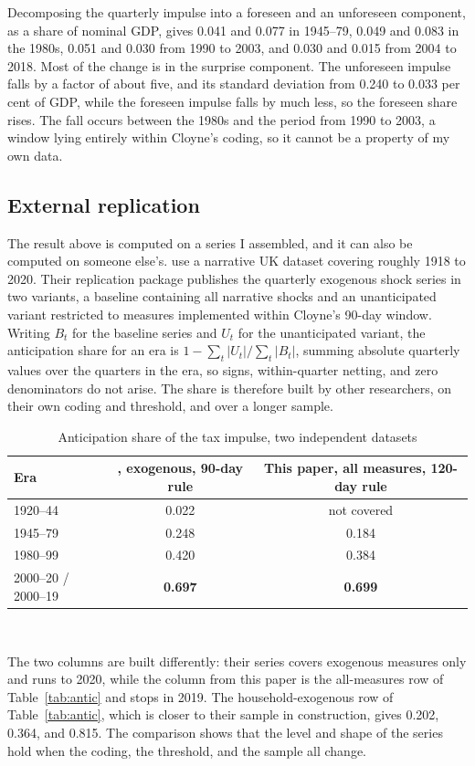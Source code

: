 \documentclass[11pt,a4paper]{article}
\begin{document}
Decomposing the quarterly impulse into a foreseen and an unforeseen component, as a share of nominal
GDP, gives 0.041 and 0.077 in 1945--79, 0.049 and 0.083 in the 1980s, 0.051 and 0.030 from 1990 to
2003, and 0.030 and 0.015 from 2004 to 2018. Most of the change is in the surprise component. The unforeseen impulse falls by a factor of about five, and its standard deviation from 0.240 to 0.033 per cent of GDP, while the foreseen impulse falls by much less, so the foreseen share rises. The fall occurs between the 1980s and the period from 1990 to 2003, a window lying entirely within
Cloyne's coding, so it cannot be a property of my own data.

\subsection{External replication}\label{sec:external}

The result above is computed on a series I assembled, and it can also be computed on someone else's.
\citet{cloyne2025} use a narrative UK dataset covering roughly 1918 to 2020. Their replication package publishes the quarterly exogenous shock series in two variants, a
baseline containing all narrative shocks and an unanticipated variant restricted to measures
implemented within Cloyne's 90-day window. Writing $B_t$ for the baseline series and $U_t$ for the
unanticipated variant, the anticipation share for an era is $1 - \sum_t |U_t| / \sum_t |B_t|$, summing
absolute quarterly values over the quarters in the era, so signs, within-quarter netting, and zero denominators do not arise. The share is therefore built by other researchers, on their own coding and threshold, and over a longer sample.

\begin{table}[htbp]
\centering
\footnotesize
\caption{Anticipation share of the tax impulse, two independent datasets}
\label{tab:external}
\begin{tabular}{lcc}
\toprule
Era & \citet{cloyne2025}, exogenous, 90-day rule & This paper, all measures, 120-day rule \\
\midrule
1920--44 & 0.022 & not covered \\
1945--79 & 0.248 & 0.184 \\
1980--99 & 0.420 & 0.384 \\
2000--20 / 2000--19 & \textbf{0.697} & \textbf{0.699} \\
\bottomrule
\end{tabular}
\\[4pt]
\begin{minipage}{0.86\textwidth}
\footnotesize The two columns are built differently: their series covers exogenous measures only and
runs to 2020, while the column from this paper is the all-measures row of Table~\ref{tab:antic} and
stops in 2019. The household-exogenous row of Table~\ref{tab:antic}, which is closer to their sample
in construction, gives 0.202, 0.364, and 0.815. The comparison shows that the level and shape of the
series hold when the coding, the threshold, and the sample all change.
\end{minipage}
\end{table}
\end{document}
